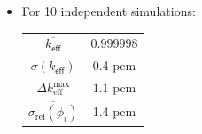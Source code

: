 \documentclass[xcolor=dvipsnames]{beamer}
\newcommand{\keff}[0]{\ensuremath{{k}_{\textsf{eff}}} }
\newlength{\wideitemsep}
\let\olditem\item
\renewcommand{\item}{\setlength{\itemsep}{\wideitemsep}\olditem}
\begin{document}
\begin{frame}
\begin{minipage}{0.49\textwidth}
\begin{itemize}
        \item For 10 independent simulations:{\large
        	\begin{center}
            \begin{tabular}{|cc|} \hline
                  $\overline{\keff}$ & $0.999998$ \\ 
                    $\sigma(\keff)$ & 0.4 pcm \\
                   $\Delta k_{\text{eff}}^{\max}$  & $1.1$ pcm \\
                $\overline{\sigma_{\text{rel}}(\phi_i)}$ & 1.4 pcm\\ \hline
           \end{tabular}
           \end{center}}
    \end{itemize}
    \end{minipage}
\end{frame}
\end{document}
